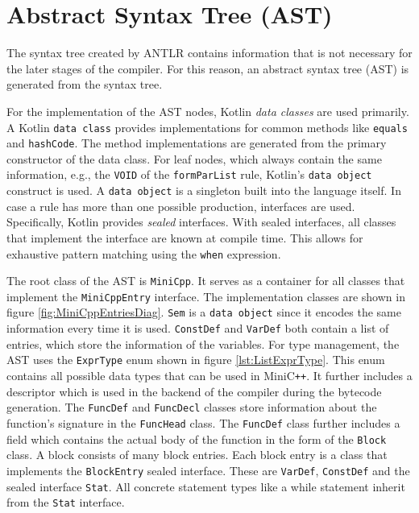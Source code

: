 \section{Abstract Syntax Tree (AST)}

The syntax tree created by ANTLR contains information that is not necessary for the later stages of the compiler. For this reason, an abstract syntax tree (AST) is generated from the syntax tree. 

For the implementation of the AST nodes, Kotlin \textit{data classes} are used primarily. A Kotlin \texttt{data class} provides implementations for common methods like \texttt{equals} and \verb|hashCode|. The method implementations are generated from the primary constructor of the data class. For leaf nodes, which always contain the same information, e.g., the \verb|VOID| of the \verb|formParList| rule, Kotlin's \verb|data object| construct is used. A \verb|data object| is a singleton built into the language itself. In case a rule has more than one possible production, interfaces are used. Specifically, Kotlin provides \textit{sealed} interfaces. With sealed interfaces, all classes that implement the interface are known at compile time. This allows for exhaustive pattern matching using the \verb|when| expression. 

The root class of the AST is \verb|MiniCpp|. It serves as a container for all classes that implement the \verb|MiniCppEntry| interface. The implementation classes are shown in figure \ref{fig:MiniCppEntriesDiag}. \verb|Sem| is a \verb|data object| since it encodes the same information every time it is used. \verb|ConstDef| and \verb|VarDef| both contain a list of entries, which store the information of the variables. For type management, the AST uses the \verb|ExprType| enum shown in figure \ref{lst:ListExprType}. This enum contains all possible data types that can be used in MiniC\verb|++|. It further includes a descriptor which is used in the backend of the compiler during the bytecode generation. The \verb|FuncDef| and \verb|FuncDecl| classes store information about the function's signature in the \verb|FuncHead| class. The  \verb|FuncDef| class further includes a field which contains the actual body of the function in the form of the \texttt{Block} class. A block consists of many block entries. Each block entry is a class that implements the \verb|BlockEntry| sealed interface. These are \verb|VarDef|, \verb|ConstDef| and the sealed interface \verb|Stat|. All concrete statement types like a while statement inherit from the \verb|Stat| interface. 

